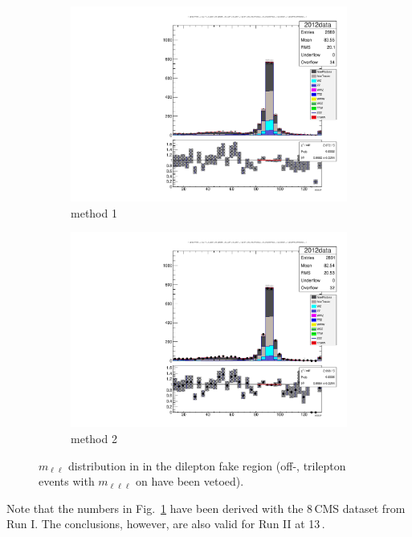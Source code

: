 \begin{figure}
\begin{center}
	\begin{subfigure}[b]{.7\textwidth}
		\includegraphics[width=\textwidth]{Appendix/Z_NOTTRILEPTONONZ_oldMOSSF}%
		\caption{method 1}
	\end{subfigure}
	\begin{subfigure}[b]{.7\textwidth}
		\includegraphics[width=\textwidth]{Appendix/Z_NOTTRILEPTONONZ_MOSSF}
		\caption{method 2}
	\end{subfigure}
	\caption{$m_{\ell\ell}$ distribution in in the dilepton fake region (off-\Z, trilepton events with $m_{\ell\ell\ell}$ on \Z have been vetoed).
	\label{fig:app:Zbinning}}
\end{center}
\end{figure}

Note that the numbers in Fig.~\ref{fig:app:Zbinning} have been derived with the 8\,\TeV CMS dataset from Run I. The conclusions, however, are also valid for Run II at 13\,\TeV.
